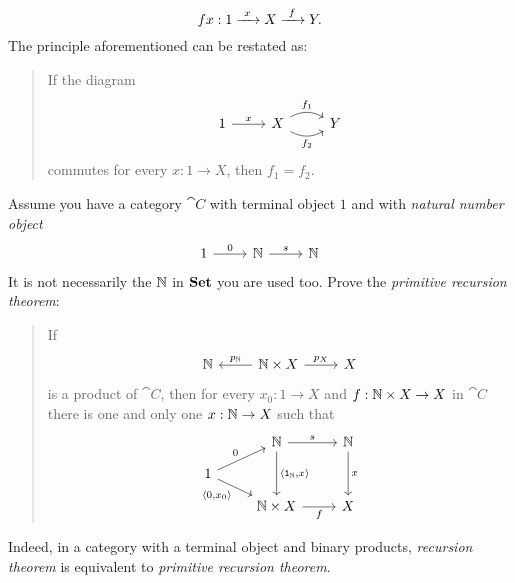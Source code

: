 \begin{exercise}
\[f x : 1 \xrightarrow{\ x\ } X \xrightarrow{\ f\ } Y .\]
The principle aforementioned can be restated as:
\begin{quotation}
If the diagram
\[\begin{tikzcd}
1 \ar["x", r] & X \ar["{f_1}", r, bend left] \ar["{f_2}", r, bend right, swap] & Y
\end{tikzcd}\]
commutes for every \(x : 1 \to X\), then \(f_1 = f_2\).
\end{quotation}
\end{exercise}

\begin{exercise}
Assume you have a category \(\cat C\) with terminal object \(1\) and with {\em natural number object}
\[\begin{tikzcd}
1 \ar["0", r] & \naturals \ar["s", r] & \naturals
\end{tikzcd}\]
It is not necessarily the \(\mathbb N\) in \(\mathbf{Set}\) you are used too. Prove the {\em primitive recursion theorem}:
\begin{quotation}
If
\[\begin{tikzcd}
\naturals & \naturals \times X \ar["{p_\naturals}", l, swap] \ar["{p_X}", r] & X
\end{tikzcd}\]
is a product of \(\cat C\), then for every \(x_0 : 1 \to X\) and \(f : \mathbb N \times X \to X\) in \(\cat C\) there is one and only one \(x : \mathbb N \to X\) such that
\[\begin{tikzcd}[row sep=small]
& \naturals \ar["s", r] \ar["{\angled{\id_\naturals, x}}", dd] & \naturals \ar["x", dd] \\
1 \ar["0", ur] \ar["{\angled{0, x_0}}", dr, swap] \\
& \naturals \times X \ar["f", r, swap] & X
\end{tikzcd}\]
\end{quotation}
Indeed, in a category with a terminal object and binary products, {\em recursion theorem} is equivalent to {\em primitive recursion theorem}. 
\end{exercise}

